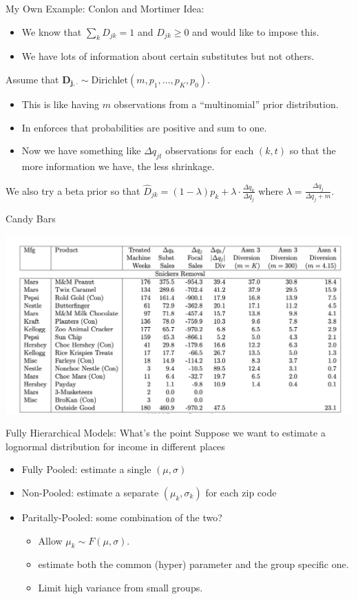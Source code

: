 \documentclass[xcolor=pdftex,dvipsnames,table,mathserif,aspectratio=169]{beamer}
\begin{document}
\begin{frame}{My Own Example: Conlon and Mortimer}
Idea:
\begin{itemize}
\item We know that $\sum_k D_{jk} =1$ and $D_{jk} \geq 0$ and would like to impose this.
\item We have lots of information about certain substitutes but not others.
\end{itemize}
Assume that $\mathbf{D_{j,\cdot}} \sim \text{Dirichlet}(m, p_1,\ldots,p_K,p_0)$.
\begin{itemize}
\item This is like having $m$ observations from a ``multinomial'' prior distribution.
\item In enforces that probabilities are positive and sum to one.
\item Now we have something like $\Delta q_{jt}$ observations for each $(k,t)$ so that the more information we have, the less shrinkage.
\end{itemize}
We also try a beta prior so that $\hat{D}_{jk} = (1-\lambda) p_k + \lambda\cdot \frac{\Delta q_k}{\Delta q_j}$ where $\lambda = \frac{\Delta q_j}{\Delta q_j + m}$.
\end{frame}


\begin{frame}[fragile]{Candy Bars}
\begin{center}
\includegraphics[height=0.8\textheight]{./resources/diversion.png}
\end{center}
\end{frame}

\begin{frame}{Fully Hierarchical Models: What's the point}
Suppose we want to estimate a lognormal distribution for income in different places
\begin{itemize}
\item Fully Pooled: estimate a single $(\mu,\sigma)$
\item Non-Pooled: estimate a separate $(\mu_k,\sigma_k)$ for each zip code
\item Paritally-Pooled: some combination of the two?
\begin{itemize}
\item Allow $\mu_k \sim F(\mu,\sigma)$.
\item estimate both the common (hyper) parameter and the group specific one.
\item Limit high variance from small groups.
\end{itemize}
\end{itemize}
\end{frame}
\end{document}
